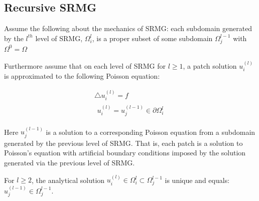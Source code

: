 \documentclass[final]{siamart1116}
\numberwithin{theorem}{section}
\begin{document}



\subsection{Recursive SRMG}

Assume the following about the mechanics of SRMG: each subdomain generated by the $l^{th}$ level of SRMG, $\Omega^{l}_i$, is a proper subset of some subdomain $\Omega^{l-1}_j$ with $\Omega^{0} = \Omega$ 

Furthermore assume that on each level of SRMG for $l \geq 1$, a patch solution $u^{(l)}_i$ is approximated to the following Poisson equation:

\begin{gather}
  \bigtriangleup u^{(l)}_i = f \nonumber  \\
  \begin{split}
    u^{(l)}_i = u^{(l-1)}_j \in \partial \Omega^{l}_i \label{patchpdel}
  \end{split}
\end{gather}

Here $u^{(l-1)}_j$ is a solution to a corresponding Poisson equation from a subdomain generated by the previous level of SRMG. That is, each patch is a solution to Poisson's equation with artificial boundary conditions imposed by the solution generated via the previous level of SRMG.



\begin{theorem}
For $l \geq 2$, the analytical solution  $u^{(l)}_i \in  \Omega^{l}_i \subset \Omega^{l-1}_j $ is unique and equals:
$u^{(l-1)}_j \in \Omega^{l-1}_j $.  
\end{theorem}
\end{document}
